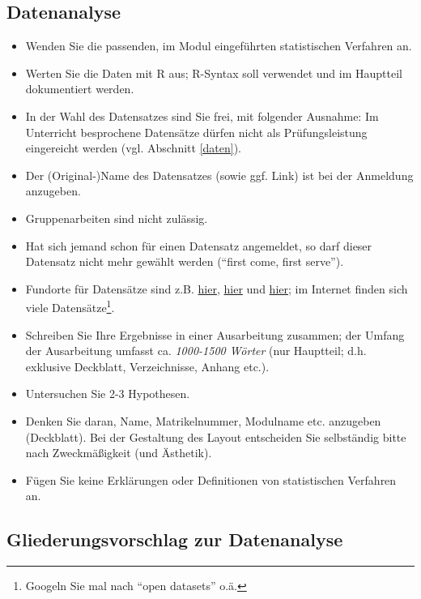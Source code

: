 \documentclass[12pt,ngerman,]{book}
\let\rmarkdownfootnote\footnote%
\def\footnote{\protect\rmarkdownfootnote}
\begin{document}
\subsection{Datenanalyse}\label{datenanalyse}

\begin{itemize}
\item
  Wenden Sie die passenden, im Modul eingeführten statistischen
  Verfahren an.
\item
  Werten Sie die Daten mit R aus; R-Syntax soll verwendet und im
  Hauptteil dokumentiert werden.
\item
  In der Wahl des Datensatzes sind Sie frei, mit folgender Ausnahme: Im
  Unterricht besprochene Datensätze dürfen nicht als Prüfungsleistung
  eingereicht werden (vgl. Abschnitt \ref{daten}).
\item
  Der (Original-)Name des Datensatzes (sowie ggf. Link) ist bei der
  Anmeldung anzugeben.
\item
  Gruppenarbeiten sind nicht zulässig.
\item
  Hat sich jemand schon für einen Datensatz angemeldet, so darf dieser
  Datensatz nicht mehr gewählt werden (``first come, first serve'').
\item
  Fundorte für Datensätze sind z.B.
  \href{http://www.stat.ufl.edu/~winner/datasets.html}{hier},
  \href{http://archive.ics.uci.edu/ml/datasets.html}{hier} und
  \href{http://vincentarelbundock.github.io/Rdatasets/datasets.html}{hier};
  im Internet finden sich viele Datensätze\footnote{Googeln Sie mal nach
    ``open datasets'' o.ä.}.
\item
  Schreiben Sie Ihre Ergebnisse in einer Ausarbeitung zusammen; der
  Umfang der Ausarbeitung umfasst ca. \emph{1000-1500 Wörter} (nur
  Hauptteil; d.h. exklusive Deckblatt, Verzeichnisse, Anhang etc.).
\item
  Untersuchen Sie 2-3 Hypothesen.
\item
  Denken Sie daran, Name, Matrikelnummer, Modulname etc. anzugeben
  (Deckblatt). Bei der Gestaltung des Layout entscheiden Sie selbständig
  bitte nach Zweckmäßigkeit (und Ästhetik).
\item
  Fügen Sie keine Erklärungen oder Definitionen von statistischen
  Verfahren an.
\end{itemize}

\subsection{Gliederungsvorschlag zur
Datenanalyse}\label{gliederungsvorschlag-zur-datenanalyse}
\end{document}
